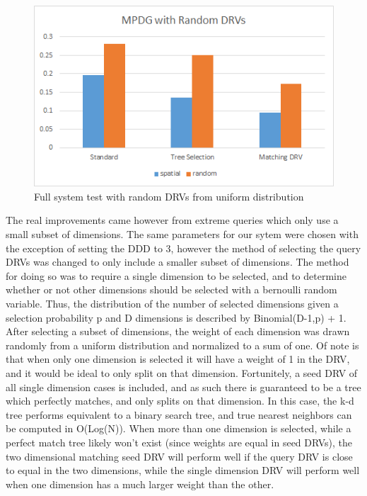 \begin{figure}[h]
\begin{center}
\includegraphics[width=.85\textwidth]{Figures/fullsysrand}
\end{center}
\caption{Full system test with random DRVs from uniform distribution}
\label{fig:fullsysrand}
\end{figure}

The real improvements came however from extreme queries which only use a small subset of dimensions.  The same parameters for our sytem were chosen with the exception of setting the DDD to 3, however the method of selecting the query DRVs was changed to only include a smaller subset of dimensions.  The method for doing so was to require a single dimension to be selected, and to determine whether or not other dimensions should be selected with a bernoulli random variable.  Thus, the distribution of the number of selected dimensions given a selection probability p and D dimensions is described by Binomial(D-1,p) + 1.  After selecting a subset of dimensions, the weight of each dimension was drawn randomly from a uniform distribution and normalized to a sum of one.  Of note is that when only one dimension is selected it will have a weight of 1 in the DRV, and it would be ideal to only split on that dimension.  Fortunitely, a seed DRV of all single dimension cases is included, and as such there is guaranteed to be a tree which perfectly matches, and only splits on that dimension.  In this case, the k-d tree performs equivalent to a binary search tree, and true nearest neighbors can be computed in O(Log(N)).  When more than one dimension is selected, while a perfect match tree likely won't exist (since weights are equal in seed DRVs), the two dimensional matching seed DRV will perform well if the query DRV is close to equal in the two dimensions, while the single dimension DRV will perform well when one dimension has a much larger weight than the other.

